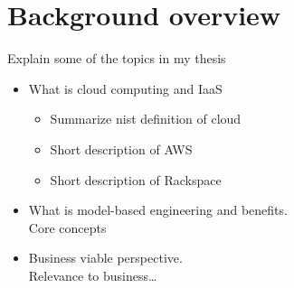 \section{Background overview}

Explain some of the topics in my thesis

\begin{itemize}
  \item What is cloud computing and IaaS
    \begin{itemize}
      \item Summarize nist definition of cloud
      \item Short description of AWS
      \item Short description of Rackspace
    \end{itemize}
  \item What is model-based engineering and benefits. \\
      Core concepts
  \item Business viable perspective. \\
    Relevance to business\ldots
\end{itemize}
